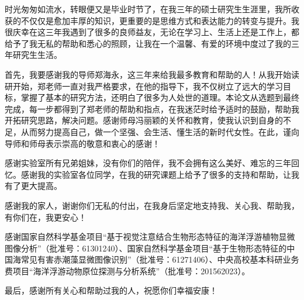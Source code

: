 \begin{acknowledgement}
时光匆匆如流水，转眼便又是毕业时节了，在我三年的硕士研究生生涯里，我所收获的不仅仅是愈加丰厚的知识，更重要的是思维方式和表达能力的转变与提升。我很庆幸在这三年我遇到了很多的良师益友，无论在学习上、生活上还是工作上，都给予了我无私的帮助和悉心的照顾，让我在一个温馨、有爱的环境中度过了我的三年研究生生活。

首先，我要感谢我的导师郑海永，这三年来给我最多教育和帮助的人！从我开始读研开始，郑老师一直对我严格要求，在他的指导下，我不仅树立了远大的学习目标，掌握了基本的研究方法，还明白了很多为人处世的道理。本论文从选题到最终完成，每一步都得到了郑老师的帮助和指点，在我迷茫时给予适时的鼓励，帮助我开拓研究思路，解决问题。感谢师母冯丽颖的关怀和教育，使我认识到自身的不足，从而努力提高自己，做一个坚强、会生活、懂生活的新时代女性。在此，谨向导师和师母表示崇高的敬意和衷心的感谢！

感谢实验室所有兄弟姐妹，没有你们的陪伴，我不会拥有这么美好、难忘的三年回忆。感谢我的实验室各位同学，在我的研究课题上给予了很多的支持和帮助，让我有了更大提高。

感谢我的家人，谢谢你们无私的付出，在我身后坚定地支持我、关心我、帮助我，有你们在，我更安心！

感谢国家自然科学基金项目“基于视觉注意结合生物形态特征的海洋浮游植物显微图像分析”（批准号：61301240）、国家自然科学基金项目“基于生物形态特征的中国海常见有害赤潮藻显微图像识别”（批准号：61271406）、中央高校基本科研业务费项目“海洋浮游动物原位探测与分析系统”（批准号：201562023）。

最后，感谢所有关心和帮助过我的人，祝愿你们幸福安康！
\end{acknowledgement}
